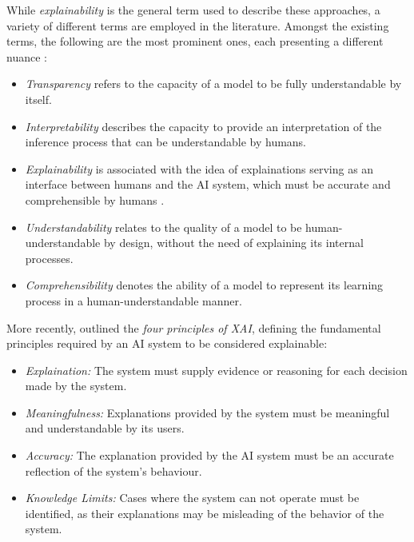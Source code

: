While \textit{explainability} is the general term used to describe these approaches, a variety of different terms are employed in the literature. Amongst the existing terms, the following are the most prominent ones, each presenting a different nuance \citep{barredo_arrieta_explainable_2020,adadi_explainability_2018,gilpin_explainability_2018}:
\begin{itemize}
    \item \textit{Transparency} refers to the capacity of a model to be fully understandable by itself.
    \item \textit{Interpretability} describes the capacity to provide an interpretation of the inference process that can be understandable by humans. 
    \item \textit{Explainability} is associated with the idea of explainations serving as an interface between humans and the AI system, which must be accurate and comprehensible by humans \citep{guidotti_explainability_2018}.
    \item \textit{Understandability} relates to the quality of a model to be human-understandable by design, without the need of explaining its internal processes.
    \item \textit{Comprehensibility} denotes the ability of a model to represent its learning process in a human-understandable manner.
\end{itemize}

More recently, \cite{phillips_explainability_2021} outlined the \textit{four principles of XAI}, defining the fundamental principles required by an AI system to be considered explainable:

\begin{itemize}
    \item \textit{Explaination:} The system must supply evidence or reasoning for each decision made by the system.
    \item \textit{Meaningfulness:} Explanations provided by the system must be meaningful and understandable by its users.
    \item \textit{Accuracy:} The explanation provided by the AI system must be an accurate reflection of the system's behaviour.
    \item \textit{Knowledge Limits:} Cases where the system can not operate must be identified, as their explanations may be misleading of the behavior of the system.
    
\end{itemize}

